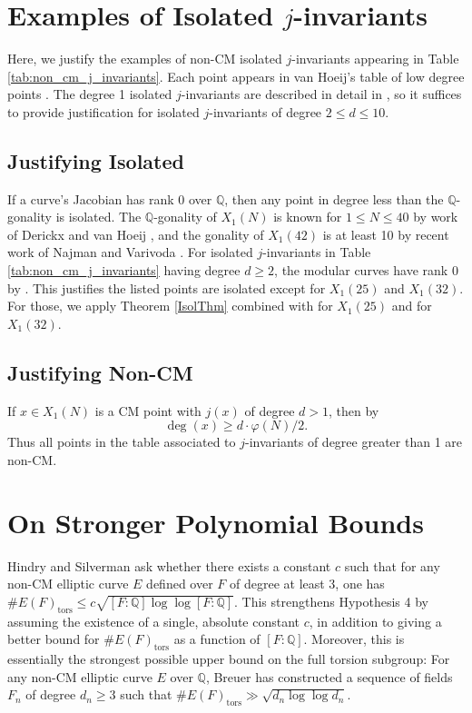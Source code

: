 \documentclass{amsart}
\theoremstyle{definition}
\newcommand{\tors}{\operatorname{tors}}
\newcommand{\Q}{\mathbb{Q}}
\begin{document}
\section{Examples of Isolated $j$-invariants} \label{ExampleSection}

Here, we justify the examples of non-CM isolated $j$-invariants appearing in Table \ref{tab:non_cm_j_invariants}. Each point appears in van Hoeij's table of low degree points \cite{vanHoeij}. The degree 1 isolated $j$-invariants are described in detail in \cite{Algorithm2025}, so it suffices to provide justification for isolated $j$-invariants of degree $2 \leq d \leq 10$. 

\subsection{Justifying Isolated} If a curve's Jacobian has rank 0 over $\Q$, then any point in degree less than the $\Q$-gonality is isolated. The $\Q$-gonality of $X_1(N)$ is known for $1 \leq N \leq 40$ by work of Derickx and van Hoeij \cite{DerickxVanHoeij2014}, and the gonality of $X_1(42)$ is at least 10 by recent work of Najman and Varivoda \cite{NajmanVarivoda}. For isolated $j$-invariants in Table \ref{tab:non_cm_j_invariants} having degree $d\geq 2$, the modular curves have rank 0 by \cite[Theorem 3.1]{DEvHMZB2021}. This justifies the listed points are isolated except for $X_1(25)$ and $X_1(32)$. For those, we apply Theorem \ref{IsolThm} combined with \cite[Theorem 3]{DerickxVanHoeij2014} for $X_1(25)$ and \cite[Theorem 1.1]{NajmanVarivoda} for $X_1(32)$.

\subsection{Justifying Non-CM} If $x\in X_1(N)$ is a CM point with $j(x)$ of degree $d>1$, then by \cite[Theorem 6.2]{BC1}
\[
\deg(x) \geq d \cdot \varphi(N)/2.
\]
Thus all points in the table associated to $j$-invariants of degree greater than 1 are non-CM.

\section{On Stronger Polynomial Bounds}
Hindry and Silverman \cite[$\S3$]{HS99} ask whether there exists a constant $c$ such that for any non-CM elliptic curve $E$ defined over $F$ of degree at least 3, one has $\# E(F)_{\tors} \leq c \sqrt{[F:\Q] \log \log [F:\Q]}$. This strengthens Hypothesis 4 by assuming the existence of a single, absolute constant $c$, in addition to giving a better bound for $\# E(F)_{\tors}$ as a function of $[F:\Q]$. Moreover, this is essentially the strongest possible upper bound on the full torsion subgroup: For any non-CM elliptic curve $E$ over $\Q$, Breuer \cite[Theorem 2.1]{Bre10} has constructed a sequence of fields $F_n$ of degree $d_n \geq 3$ such that $\#E(F)_{\tors} \gg \sqrt{d_n \log \log d_n}$.
\end{document}
